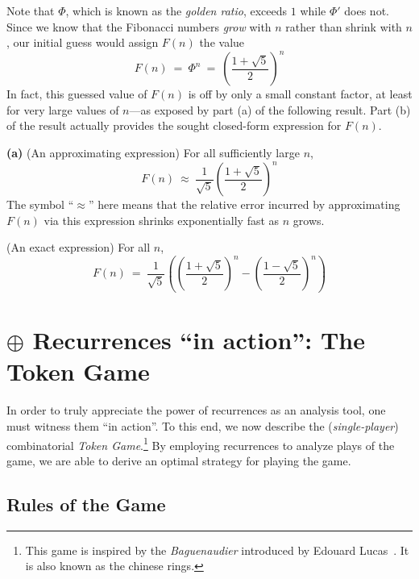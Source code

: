 \noindent
Note that $\Phi$, which is known as the \textit{golden ratio}, exceeds $1$ while $\Phi'$ does not.  Since we know that the Fibonacci numbers {\em grow} with $n$ rather than shrink with $n$, our initial guess would assign $F(n)$ the value
\[ F(n) \ = \ \Phi^n \ = \ {\displaystyle \left( \frac{1+\sqrt{5}}{2} \right)^n } \]
In fact, this guessed value of $F(n)$ is off by only a small constant factor, at least for very large values of $n$---as exposed by part (a) of the following result.  Part (b) of the result actually provides the sought closed-form expression for $F(n)$.

\begin{prop}
\label{thm:FibNo-GoldenRatio}
{\bf (a)} {\rm (An approximating expression)}
For all sufficiently large $n$,
\[ F(n) \ \approx \ \frac{1}{\sqrt{5}} \left(\frac{1+\sqrt{5}}{2} \right)^n \]
The symbol ``$\approx$'' here means that the relative error incurred by approximating $F(n)$ via this expression shrinks exponentially fast as $n$ grows.

\medskip

 {\rm (An exact expression)}
For all $n$,
\[ F(n) \ = \ 
\frac{1}{\sqrt{5}} \left( \left(\frac{1+\sqrt{5}}{2} \right)^n - \left(\frac{1-\sqrt{5}}{2} \right)^n \right)
\]
\end{prop}




\section{$\oplus$ Recurrences ``in action'': The Token Game}
\label{sec:TokenGame}

In order to truly appreciate the power of recurrences as an analysis tool, one must witness them ``in action''.  
To this end, we now describe the ({\it single-player}) combinatorial {\it Token Game}.\footnote{This game is inspired by the \textit{Baguenaudier} introduced by Edouard Lucas~\cite{Lucas}. It is also known as the chinese rings.}
By employing recurrences to analyze plays of the game, we are able to derive an optimal strategy for playing the game.

\subsection{Rules of the Game}
\label{sec:TokenGame-Rules}

